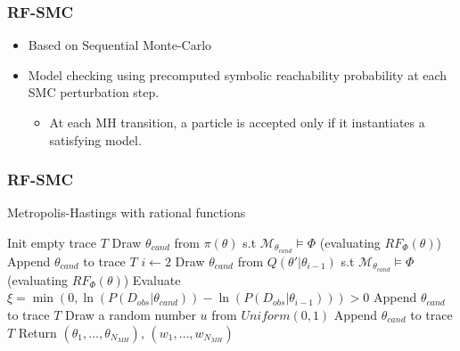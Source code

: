 \documentclass{beamer}
\begin{document}
\begin{frame}
    \frametitle{RF-SMC}
    \begin{itemize}
        \item Based on Sequential Monte-Carlo
        \item Model checking using precomputed symbolic reachability probability at each SMC
              perturbation step.
              \begin{itemize}
                  \item At each MH transition, a particle is accepted only if it instantiates a
                        satisfying model.
              \end{itemize}
    \end{itemize}
\end{frame}

\begin{frame}
    \frametitle{RF-SMC}
    \footnotesize{
        \begin{algorithm}[H]
            \caption{Metropolis-Hastings with rational functions}
            \label{alg:rf-mh}
            \begin{algorithmic}[1]
                \State Init empty trace $T$
                \State Draw $\theta_{cand}$ from $\pi(\theta)$ s.t $\mathcal{M}_{\theta_{cand}}\models\Phi$ (evaluating $RF_{\Phi}(\theta)$)
                \State Append $\theta_{cand}$ to trace $T$
                \State $i \leftarrow 2$
                \State Draw $\theta_{cand}$ from $Q(\theta'|\theta_{i-1})$ s.t $\mathcal{M}_{\theta_{cand}}\models\Phi$ (evaluating $RF_{\Phi}(\theta)$)
                \State Evaluate $\xi = \min(0, \ln(P(D_{obs}|\theta_{cand})) - \ln(P(D_{obs}|\theta_{i-1}))) > 0$
                \State Append $\theta_{cand}$ to trace $T$
                \Else
                \State Draw a random number $u$ from $Uniform(0,1)$
                \State Append $\theta_{cand}$ to trace $T$
                \EndIf
                \EndIf
                \EndWhile
                \State Return $(\theta_1,\ldots,\theta_{N_{MH}})$, $(w_1,\ldots,w_{N_{MH}})$
                \EndProcedure
            \end{algorithmic}
        \end{algorithm}
    }
\end{frame}
\end{document}

